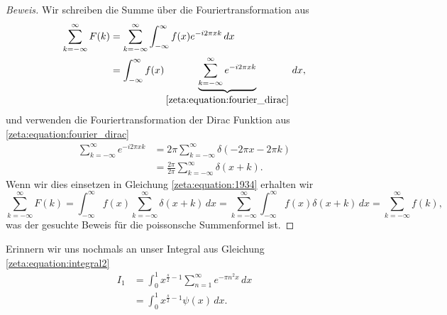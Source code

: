 \begin{proof}[Beweis]
    Wir schreiben die Summe über die Fouriertransformation aus
    \begin{align}
        \sum_{k=-\infty}^{\infty}
        F(k)
        &=
        \sum_{k=-\infty}^{\infty}
        \int_{-\infty}^{\infty}
        f(x)
        e^{-i 2\pi x k}
        \, dx
        \\
        &=
        \int_{-\infty}^{\infty}
        f(x)
        \underbrace{
        \sum_{k=-\infty}^{\infty}
        e^{-i 2\pi x k}
        }_{\displaystyle{\text{\eqref{zeta:equation:fourier_dirac}}}}
        \, dx, \label{zeta:equation:1934}
    \end{align}
    und verwenden die Fouriertransformation der Dirac Funktion aus \eqref{zeta:equation:fourier_dirac}
    \begin{align}
        \sum_{k=-\infty}^{\infty}
        e^{-i 2\pi x k}
        &=
        2 \pi
        \sum_{k=-\infty}^{\infty}
        \delta(-2\pi x - 2\pi k)
        \\
        &=
        \frac{2 \pi}{2 \pi}
        \sum_{k=-\infty}^{\infty}
        \delta(x + k).
    \end{align}
    Wenn wir dies einsetzen in Gleichung \eqref{zeta:equation:1934} erhalten wir
    \begin{equation}
        \sum_{k=-\infty}^{\infty}
        F(k)
        =
        \int_{-\infty}^{\infty}
        f(x)
        \sum_{k=-\infty}^{\infty}
        \delta(x + k)
        \, dx
        =
        \sum_{k=-\infty}^{\infty}
        \int_{-\infty}^{\infty}
        f(x)
        \delta(x + k)
        \, dx
        =
        \sum_{k=-\infty}^{\infty}
        f(k),
    \end{equation}
    was der gesuchte Beweis für die poissonsche Summenformel ist.
\end{proof}

Erinnern wir uns nochmals an unser Integral aus Gleichung \eqref{zeta:equation:integral2}
\begin{align*}
    I_1
    &=
    \int_0^{1}
    x^{\frac{s}{2}-1}
    \sum_{n=1}^{\infty}
    e^{-\pi n^2 x}
    \,dx
    \\
    &=
    \int_0^{1}
    x^{\frac{s}{2}-1}
    \psi(x)
    \,dx
    .
\end{align*}

